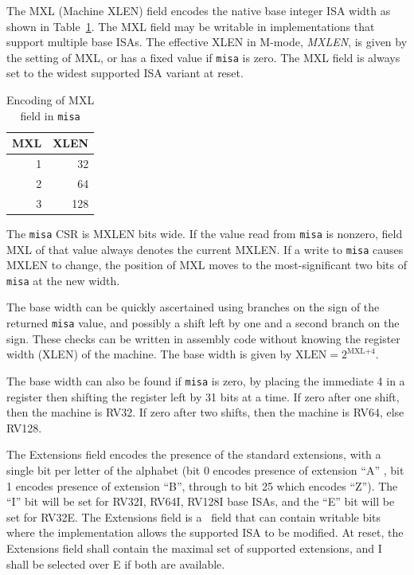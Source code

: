 The MXL (Machine XLEN) field encodes the native base integer ISA width
as shown in Table~\ref{misabase}.  The MXL field may be writable in
implementations that support multiple base ISAs.  The effective
XLEN in M-mode, {\em MXLEN}, is given by the setting of MXL, or has a
fixed value if {\tt misa} is zero.  The MXL field is always set to the
widest supported ISA variant at reset.

\begin{table}[h!]
\begin{center}
\begin{tabular}{|r|r|}
\hline
MXL  & XLEN \\
\hline
1   & 32 \\
2   & 64 \\
3   & 128 \\
\hline
\end{tabular}
\end{center}
\caption{Encoding of MXL field in {\tt misa}}
\label{misabase}
\end{table}

The {\tt misa} CSR is MXLEN bits wide.  If the value read from {\tt misa} is
nonzero, field MXL of that value always denotes the current MXLEN. If a write
to {\tt misa} causes MXLEN to change, the position of MXL moves to the
most-significant two bits of {\tt misa} at the new width.

\begin{commentary}
The base width can be quickly ascertained using branches on the sign
of the returned {\tt misa} value, and possibly a shift left by one and
a second branch on the sign.  These checks can be written in assembly
code without knowing the register width (XLEN) of the machine.  The
base width is given by $\mbox{XLEN}=2^{\mbox{MXL+4}}$.

The base width can also be found if {\tt misa} is zero, by placing the
immediate 4 in a register then shifting the register left by 31 bits
at a time.  If zero after one shift, then the machine is RV32.  If
zero after two shifts, then the machine is RV64, else RV128.
\end{commentary}

The Extensions field encodes the presence of the standard extensions,
with a single bit per letter of the alphabet (bit 0 encodes presence
of extension ``A'' , bit 1 encodes presence of extension ``B'',
through to bit 25 which encodes ``Z'').  The ``I'' bit will be set for
RV32I, RV64I, RV128I base ISAs, and the ``E'' bit will be set for
RV32E.  The Extensions field is a \warl\ field that can contain writable bits
where the implementation allows the supported ISA to be modified.  At
reset, the Extensions field shall contain the maximal set of supported
extensions, and I shall be selected over E if both are available.


